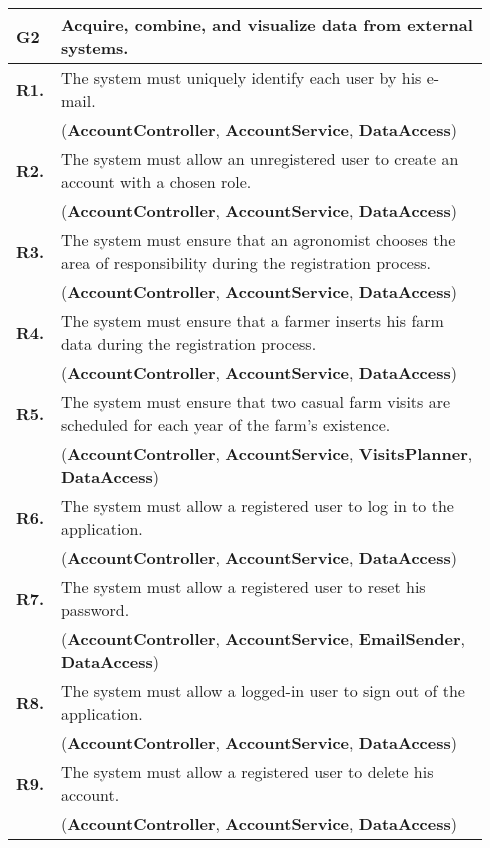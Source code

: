 \begin{longtable}{p{0.06\linewidth} p{0.88\linewidth}} 
    \toprule
    \textbf{G2} & Acquire, combine, and visualize data from external systems. \\ 
    \midrule
	\textbf{R1.} & The system must uniquely identify each user by his e-mail. \\
	& (\textbf{AccountController}, \textbf{AccountService}, \textbf{DataAccess})\\
	\textbf{R2.} & The system must allow an unregistered user to create an account with a chosen role. \\
	& (\textbf{AccountController}, \textbf{AccountService}, \textbf{DataAccess})\\
	\textbf{R3.} & The system must ensure that an agronomist chooses the area of responsibility during the registration process. \\
	& (\textbf{AccountController}, \textbf{AccountService}, \textbf{DataAccess})\\
	\textbf{R4.} & The system must ensure that a farmer inserts his farm data during the registration process.\\
	& (\textbf{AccountController}, \textbf{AccountService}, \textbf{DataAccess})\\
	\textbf{R5.} & The system must ensure that two casual farm visits are scheduled for each year of the farm's existence.\\
	& (\textbf{AccountController}, \textbf{AccountService}\todo{Added VisitsPlanner}, \textbf{VisitsPlanner}, \textbf{DataAccess})\\
	\textbf{R6.} & The system must allow a registered user to log in to the application. \\
	& (\textbf{AccountController}, \textbf{AccountService}, \textbf{DataAccess})\\
	\textbf{R7.} & The system must allow a registered user to reset his password. \\
	& (\textbf{AccountController}, \textbf{AccountService}, \textbf{EmailSender}, \textbf{DataAccess})\\
	\textbf{R8.} & The system must allow a logged-in user to sign out of the application. \\
	& (\textbf{AccountController}, \textbf{AccountService}, \textbf{DataAccess}\todo{stateless?})\\
	\textbf{R9.} & The system must allow a registered user to delete his account. \\
	& (\textbf{AccountController}, \textbf{AccountService}, \textbf{DataAccess})\\
	

\end{longtable}
